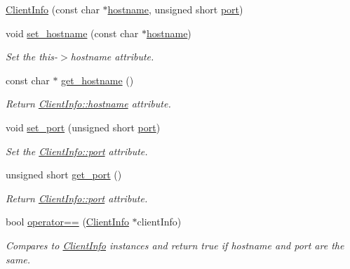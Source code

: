 \begin{DoxyCompactItemize}
\item 
\hyperlink{class_zamasu_1_1_client_info_ab52cb5122b59b3dc9db20e2e30e9aab2}{Client\+Info} (const char $\ast$\hyperlink{class_zamasu_1_1_client_info_a97baa615785948d4f8bc1f31af9ed056}{hostname}, unsigned short \hyperlink{class_zamasu_1_1_client_info_a0072d23fd63fbd8e831556940bd69ce1}{port})
\item 
void \hyperlink{class_zamasu_1_1_client_info_a0e429323ed195a608d3fb26b219f218a}{set\+\_\+hostname} (const char $\ast$\hyperlink{class_zamasu_1_1_client_info_a97baa615785948d4f8bc1f31af9ed056}{hostname})
\begin{DoxyCompactList}\small\item\em Set the this-\/$>$hostname attribute. \end{DoxyCompactList}\item 
const char $\ast$ \hyperlink{class_zamasu_1_1_client_info_a0af8d3fb69b87eb62b2d529a766346fd}{get\+\_\+hostname} ()
\begin{DoxyCompactList}\small\item\em Return \hyperlink{class_zamasu_1_1_client_info_a97baa615785948d4f8bc1f31af9ed056}{Client\+Info\+::hostname} attribute. \end{DoxyCompactList}\item 
void \hyperlink{class_zamasu_1_1_client_info_ab98aef0169df530115e542b1316bf755}{set\+\_\+port} (unsigned short \hyperlink{class_zamasu_1_1_client_info_a0072d23fd63fbd8e831556940bd69ce1}{port})
\begin{DoxyCompactList}\small\item\em Set the \hyperlink{class_zamasu_1_1_client_info_a0072d23fd63fbd8e831556940bd69ce1}{Client\+Info\+::port} attribute. \end{DoxyCompactList}\item 
unsigned short \hyperlink{class_zamasu_1_1_client_info_aa49008dae5b4cd4eaec58bfe67ca3985}{get\+\_\+port} ()
\begin{DoxyCompactList}\small\item\em Return \hyperlink{class_zamasu_1_1_client_info_a0072d23fd63fbd8e831556940bd69ce1}{Client\+Info\+::port} attribute. \end{DoxyCompactList}\item 
bool \hyperlink{class_zamasu_1_1_client_info_abb8c083b54bf5205d273f3c11568371d}{operator==} (\hyperlink{class_zamasu_1_1_client_info}{Client\+Info} $\ast$client\+Info)
\begin{DoxyCompactList}\small\item\em Compares to \hyperlink{class_zamasu_1_1_client_info}{Client\+Info} instances and return true if hostname and port are the same. \end{DoxyCompactList}\end{DoxyCompactItemize}
